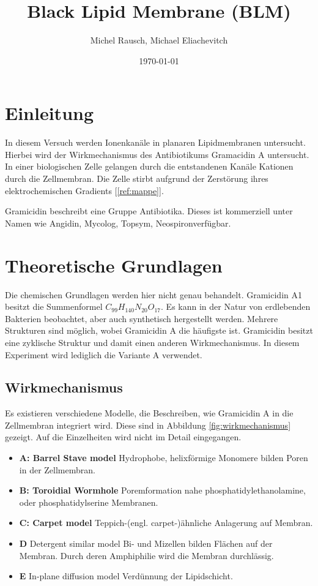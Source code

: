 \documentclass[a4paper,ngerman]{scrartcl}
\title{Black Lipid Membrane (BLM)}
\date{\today}
\author{Michel Rausch, Michael Eliachevitch}
\begin{document}
\maketitle
\tableofcontents
\newpage

\section{Einleitung}

In diesem Versuch werden Ionenkanäle in planaren Lipidmembranen untersucht. Hierbei wird der Wirkmechanismus des Antibiotikums Gramacidin A untersucht. In einer biologischen Zelle gelangen durch die entstandenen Kanäle Kationen durch die Zellmembran. Die Zelle stirbt aufgrund der Zerstörung ihres elektrochemischen Gradients [\ref{ref:mappe}].

Gramicidin beschreibt eine Gruppe Antibiotika. Dieses ist kommerziell unter Namen wie Angidin\textregistered , Mycolog\textregistered , Topsym\textregistered , Neospiron\textregistered  verfügbar. 


\section{Theoretische Grundlagen}

Die chemischen Grundlagen werden hier nicht genau behandelt. Gramicidin A1 besitzt die Summenformel $C_{99}H_{140}N_{20}O_{17}$. Es kann in der Natur von erdlebenden Bakterien beobachtet, aber auch synthetisch hergestellt werden. Mehrere Strukturen sind möglich, wobei Gramicidin A die häufigste ist. Gramicidin besitzt eine zyklische Struktur und damit einen anderen Wirkmechanismus. In diesem Experiment wird lediglich die Variante A verwendet.

\subsection{Wirkmechanismus}

Es existieren verschiedene Modelle, die Beschreiben, wie Gramicidin A in die Zellmembran integriert wird. Diese sind in Abbildung \ref{fig:wirkmechanismus} gezeigt. Auf die Einzelheiten wird nicht im Detail eingegangen.
\begin{itemize}
\item \textbf{A: Barrel Stave model} 
Hydrophobe, helixförmige Monomere bilden Poren in der Zellmembran.
\item \textbf{B: Toroidial Wormhole}  
Poremformation nahe phosphatidylethanolamine, oder phosphatidylserine Membranen. 
\item \textbf{C: Carpet model}  
Teppich-(engl. carpet-)ähnliche Anlagerung auf Membran.
\item \textbf{D} Detergent similar model
Bi- und Mizellen bilden Flächen auf der Membran. Durch deren Amphiphilie wird die Membran durchlässig.
\item \textbf{E} In-plane diffusion model
Verdünnung der Lipidschicht.
\end{itemize}
\end{document}
